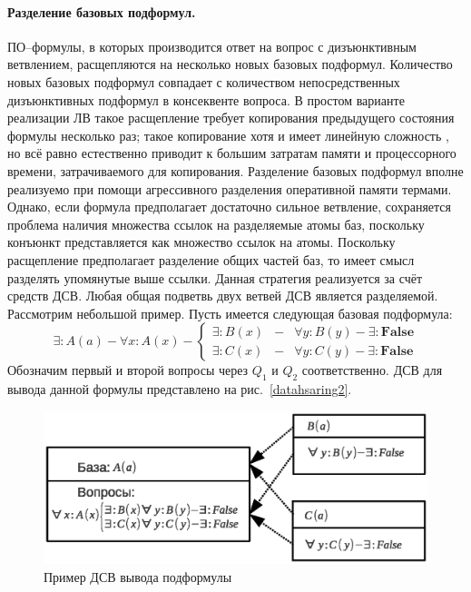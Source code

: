 \paragraph{Разделение базовых подформул.} ПО--формулы, в которых производится ответ на вопрос с дизъюнктивным ветвлением, расщепляются на несколько новых базовых подформул. Количество новых базовых подформул совпадает с количеством непосредственных дизъюнктивных подформул в консеквенте вопроса. В простом варианте реализации ЛВ \cite{dissChe} такое расщепление требует копирования предыдущего состояния формулы несколько раз; такое копирование хотя и имеет линейную сложность \cite{Che2}, но всё равно естественно приводит к большим затратам памяти и процессорного времени, затрачиваемого для копирования. Разделение базовых подформул вполне реализуемо при помощи агрессивного разделения оперативной памяти термами. Однако, если формула предполагает достаточно сильное ветвление, сохраняется проблема наличия множества ссылок на разделяемые атомы баз, поскольку конъюнкт представляется как множество ссылок на атомы. Поскольку расщепление предполагает разделение общих частей баз, то имеет смысл разделять упомянутые выше ссылки. Данная стратегия реализуется за счёт средств ДСВ. Любая общая подветвь двух ветвей ДСВ является разделяемой. Рассмотрим небольшой пример. Пусть имеется следующая базовая подформула:
$$\exists: A(a) - \forall x: A(x) - \left\{
\begin{array}{lcl}
 \exists \colon B(x) & - & \forall y: B(y) - \exists\colon\boldsymbol{False}\\
 \exists \colon C(x) & - & \forall y: C(y) - \exists\colon\boldsymbol{False}
\end{array}
\right. $$
Обозначим первый и второй вопросы через $Q_1$ и $Q_2$ соответственно. ДСВ для вывода данной формулы представлено на рис.~\ref{datahsaring2}.
\begin{figure}[h]
	\centering
	\includegraphics[width=0.7\linewidth]{pics/DataSharing2.eps}
	\caption{Пример ДСВ вывода подформулы}
	\label{fig:datasharing2}
\end{figure}

